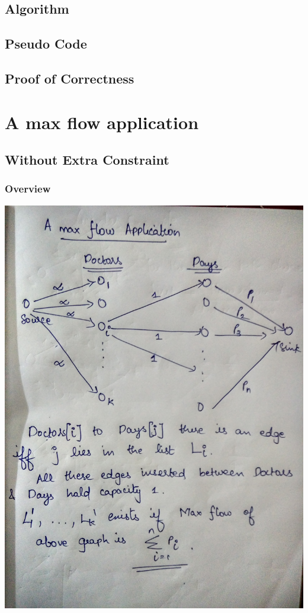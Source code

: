 \documentclass{article}
\begin{document}
\subsection{Algorithm}
\subsection{Pseudo Code}
\subsection{Proof of Correctness}
\newpage
\section{A max flow application}
\subsection{Without Extra Constraint}
\subsubsection{Overview}
\includegraphics[scale=0.15]{3a.jpg}
\end{document}
